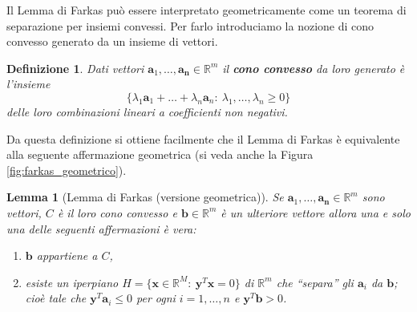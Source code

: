 \documentclass[italian, 12pt, reqno]{article}
\theoremstyle{myteo}
\newtheorem{lemma}[theorem]{Lemma}
\newtheorem{definition}[theorem]{Definizione}
\numberwithin{equation}{section}
\begin{document}
Il Lemma di Farkas può essere interpretato geometricamente come un teorema di separazione per insiemi convessi.
Per farlo introduciamo la nozione di cono convesso generato da un insieme di vettori.

\begin{definition}
  \label{def:cono_convesso}
  Dati vettori \(\mathbf{a}_1,\ldots,\mathbf{a_n}\in\mathbb{R}^m\) il \textbf{cono convesso} da loro generato è l'insieme
  \[\big\{\lambda_1\mathbf{a}_1+\ldots+\lambda_n\mathbf{a}_n\colon\ \lambda_1,\ldots,\lambda_n \geq 0\big\}\]
  delle loro combinazioni lineari a coefficienti non negativi.
\end{definition}

Da questa definizione si ottiene facilmente che il Lemma di Farkas è equivalente alla seguente affermazione geometrica (si veda anche la Figura \ref{fig:farkas_geometrico}).

\begin{lemma}[Lemma di Farkas (versione geometrica)]
  \label{lemma:farkas_geometrico}
  Se \(\mathbf{a}_1,\ldots,\mathbf{a_n}\in\mathbb{R}^m\) sono vettori, \(C\) è il loro cono convesso e \(\mathbf{b}\in\mathbb{R}^m\) è un ulteriore vettore allora una e solo una delle seguenti affermazioni è vera:
  \begin{enumerate}
  \item \(\mathbf{b}\) appartiene a \(C\),
  \item esiste un iperpiano \(H=\{\mathbf{x}\in\mathbb{R}^M\colon\ \mathbf{y}^T\mathbf{x} = 0\}\) di \(\mathbb{R}^m\) che ``separa'' gli \(\mathbf{a}_i\) da \(\mathbf{b}\); cioè tale che \(\mathbf{y}^T\mathbf{a}_i \leq 0\) per ogni \(i=1,\ldots, n\) e \(\mathbf{y}^T\mathbf{b} > 0\).
  \end{enumerate}
\end{lemma}
\end{document}
